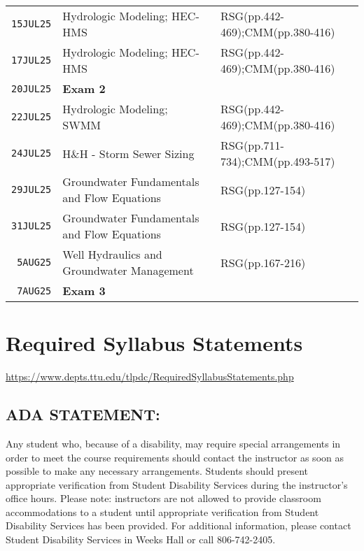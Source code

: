 \documentclass[12pt]{article}
\begin{document}
\begin{table}[ht!]
\begin{tabular}{p{0.5in}p{3.0in}p{3.0in}}
\texttt{15JUL25} & Hydrologic Modeling; HEC-HMS & RSG(pp.442-469);CMM(pp.380-416) \\  
\texttt{17JUL25} & Hydrologic Modeling; HEC-HMS & RSG(pp.442-469);CMM(pp.380-416)\\ 
\texttt{20JUL25} & \textbf{Exam 2} &  \\ %
\texttt{22JUL25} & Hydrologic Modeling; SWMM & RSG(pp.442-469);CMM(pp.380-416) \\ 
\texttt{24JUL25} & H\&H - Storm Sewer Sizing &RSG(pp.711-734);CMM(pp.493-517)  \\  
\texttt{29JUL25} & Groundwater Fundamentals and Flow Equations & RSG(pp.127-154)\\
\texttt{31JUL25} & Groundwater Fundamentals and Flow Equations & RSG(pp.127-154)  \\ 
\texttt{~5AUG25} & Well Hydraulics and Groundwater Management &  RSG(pp.167-216) \\  
\texttt{~7AUG25} & \textbf{Exam 3} &  \\ %
\hline
   \end{tabular}
   \label{tab:schedule}
\end{table}


\clearpage
\clearpage
%

\section*{Required Syllabus Statements}
\url{https://www.depts.ttu.edu/tlpdc/RequiredSyllabusStatements.php}
\subsection*{ADA STATEMENT:}
Any student who, because of a disability, may require special arrangements in order to meet the course requirements should contact the instructor as soon as possible to make any necessary arrangements. Students should present appropriate verification from Student Disability Services during the instructor's office hours. Please note: instructors are not allowed to provide classroom accommodations to a student until appropriate verification from Student Disability Services has been provided. For additional information, please contact Student Disability Services in Weeks Hall or call 806-742-2405.
\end{document}
